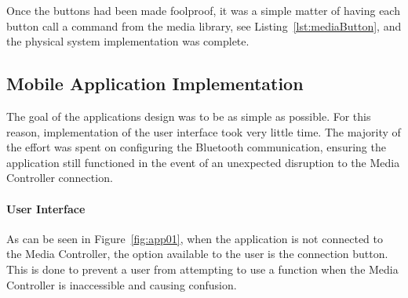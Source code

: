 \documentclass{article}
\begin{document}
			Once the buttons had been made foolproof, it was a simple matter of having each button call a command from the media library, see Listing~\ref{lst:mediaButton}, and the physical system implementation was complete. 
			
			
			
									
		\subsection{Mobile Application Implementation}
			The goal of the applications design was to be as simple as possible. For this reason, implementation of the user interface took very little time. The majority of the effort was spent on configuring the Bluetooth communication, ensuring the application still functioned in the event of an unexpected disruption to the Media Controller connection.
			
			
			\paragraph{User Interface}
			As can be seen in Figure~\ref{fig:app01}, when the application is not connected to the Media Controller, the option available to the user is the connection button. This is done to prevent a user from attempting to use a function when the Media Controller is inaccessible and causing confusion.
			
\end{document}
